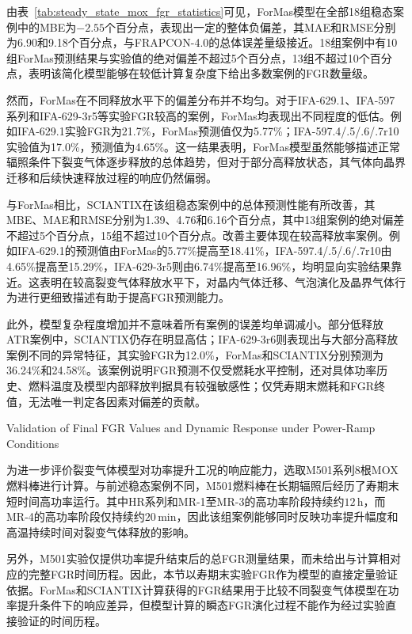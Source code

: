 由表~\ref{tab:steady_state_mox_fgr_statistics}可见，ForMas模型在全部18组稳态案例中的MBE为$-2.55$个百分点，表现出一定的整体负偏差，其MAE和RMSE分别为6.90和9.18个百分点，与FRAPCON-4.0的总体误差量级接近。18组案例中有10组ForMas预测结果与实验值的绝对偏差不超过5个百分点，13组不超过10个百分点，表明该简化模型能够在较低计算复杂度下给出多数案例的FGR数量级。

然而，ForMas在不同释放水平下的偏差分布并不均匀。对于IFA-629.1、IFA-597系列和IFA-629-3r5等实验FGR较高的案例，ForMas均表现出不同程度的低估。例如IFA-629.1实验FGR为21.7\%，ForMas预测值仅为5.77\%；IFA-597.4/.5/.6/.7r10实验值为17.0\%，预测值为4.65\%。这一结果表明，ForMas模型虽然能够描述正常辐照条件下裂变气体逐步释放的总体趋势，但对于部分高释放状态，其气体向晶界迁移和后续快速释放过程的响应仍然偏弱。

与ForMas相比，SCIANTIX在该组稳态案例中的总体预测性能有所改善，其MBE、MAE和RMSE分别为1.39、4.76和6.16个百分点，其中13组案例的绝对偏差不超过5个百分点，15组不超过10个百分点。改善主要体现在较高释放率案例。例如IFA-629.1的预测值由ForMas的5.77\%提高至18.41\%，IFA-597.4/.5/.6/.7r10由4.65\%提高至15.29\%，IFA-629-3r5则由6.74\%提高至16.96\%，均明显向实验结果靠近。这表明在较高裂变气体释放水平下，对晶内气体迁移、气泡演化及晶界气体行为进行更细致描述有助于提高FGR预测能力。

此外，模型复杂程度增加并不意味着所有案例的误差均单调减小。部分低释放ATR案例中，SCIANTIX仍存在明显高估；IFA-629-3r6则表现出与大部分高释放案例不同的异常特征，其实验FGR为12.0\%，ForMas和SCIANTIX分别预测为36.24\%和24.58\%。该案例说明FGR预测不仅受燃耗水平控制，还对具体功率历史、燃料温度及模型内部释放判据具有较强敏感性；仅凭寿期末燃耗和FGR终值，无法唯一判定各因素对偏差的贡献。

\FloatBarrier
{}
{Validation of Final FGR Values and Dynamic Response under Power-Ramp Conditions}

为进一步评价裂变气体模型对功率提升工况的响应能力，选取M501系列8根MOX燃料棒进行计算。与前述稳态案例不同，M501燃料棒在长期辐照后经历了寿期末短时间高功率运行。其中HR系列和MR-1至MR-3的高功率阶段持续约$12\,\mathrm{h}$，而MR-4的高功率阶段仅持续约$20\,\mathrm{min}$，因此该组案例能够同时反映功率提升幅度和高温持续时间对裂变气体释放的影响。

另外，M501实验仅提供功率提升结束后的总FGR测量结果，而未给出与计算相对应的完整FGR时间历程。因此，本节以寿期末实验FGR作为模型的直接定量验证依据。ForMas和SCIANTIX计算获得的FGR结果用于比较不同裂变气体模型在功率提升条件下的响应差异，但模型计算的瞬态FGR演化过程不能作为经过实验直接验证的时间历程。

